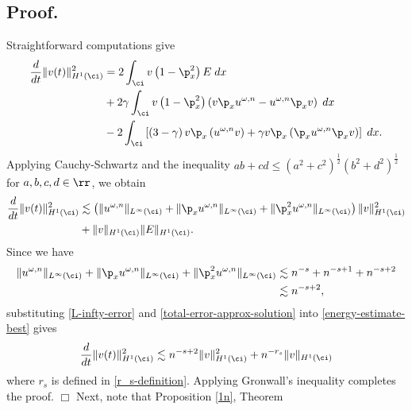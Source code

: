 			\subsection{{Proof.}} 
Straightforward computations give		
\begin{equation}
	\label{energy-estimate-simplified}
	\begin{split}
		\frac{d}{dt} \|v(t)\|_{H^1(\ci)}^2
		& = 2 \int_{\ci}
		 v\left( 1-\p_x^2
	\right)E \; dx
	\\
	&+ 2 \gamma  \int_{\ci}  v\left( 1-\p_x^2 \right)\left( v \p_x u^{\omega,n}
	- u^{\omega,n} \p_x v
	\right) \; dx
	\\
	& - 2 \int_{\ci} \left[ \left( 3-\gamma \right)v \p_x \left( u^{\omega,n}v \right) + \gamma v
	\p_x \left( \p_x u^{\omega,n} \p_x v \right)\right] \; dx.
\end{split}
\end{equation}
Applying Cauchy-Schwartz and the inequality $ab + cd \le (a^2 +
c^2)^{\frac{1}{2}}(b^2 + d^2)^{\frac{1}{2}}$ for $a,b,c,d \in \rr$, we
obtain
\begin{equation}
	\begin{split}
		\label{energy-estimate-best}
		\frac{d}{dt} \|v(t)\|_{H^1(\ci)}^2
		& \lesssim \left( \|u^{\omega,n}\|_{L^\infty(\ci)} + \|
		\p_x u^{\omega,n} \|_{L^\infty(\ci)} + \|\p_x^2 u^{\omega,n} \|_{L^\infty (\ci)} \right)
		\|v\|_{H^1(\ci)}^2 
		\\
		&+ \|v\|_{H^1(\ci)} \|E\|_{H^1(\ci)}.
	\end{split}
\end{equation}
Since we have
\begin{equation}
	\label{L-infty-error}
	\begin{split}
		\|u^{\omega,n} \|_{L^\infty(\ci)} + \|\p_x u^{\omega,n} \|_{L^\infty(\ci)}
		+ \|\p_x^2 u^{\omega,n} \|_{L^\infty(\ci)}
		& \lesssim 
		n^{-s} + n^{-s+1} + n^{-s + 2} \\
		& \lesssim n^{-s + 2}  ,
	\end{split}
\end{equation}
substituting \eqref{L-infty-error} and \eqref{total-error-approx-solution} into
\eqref{energy-estimate-best} gives
\begin{equation}
	\label{en-est-fin!}
	\frac{d}{dt} \|v(t)\|_{H^1(\ci)}^2 \lesssim n^{-s+2} \|v\|_{H^1(\ci)}^2 + n^{-r_s}
	\|v \|_{H^1(\ci)}
\end{equation}
where $r_s$ is defined in \eqref{r_s-definition}.
Applying Gronwall's inequality completes the proof. $\Box$
%
Next, note that Proposition \ref{1n}, Theorem
